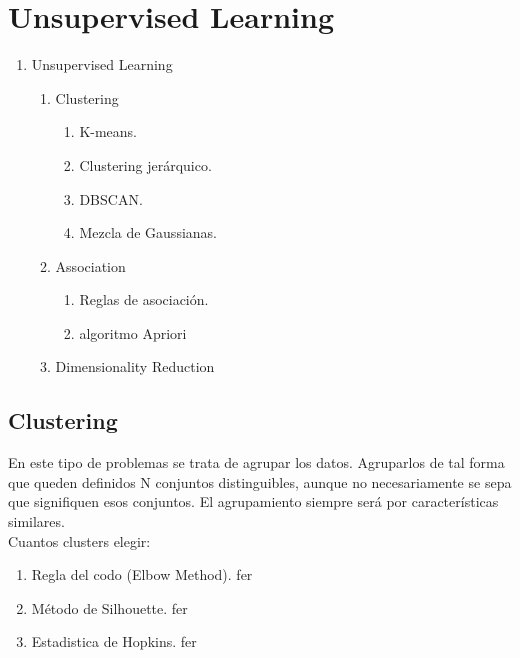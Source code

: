 \documentclass[../main.tex]{subfiles}
\begin{document}
\section{Unsupervised Learning}
    \begin{enumerate}
        \item Unsupervised Learning
        \begin{enumerate}
            \item Clustering
                \begin{enumerate}
                    \item K-means.
                    \item Clustering jerárquico.
                    \item DBSCAN.
                    \item Mezcla de Gaussianas.
                \end{enumerate}
            \item Association
                \begin{enumerate}
                    \item Reglas de asociación.
                    \item algoritmo Apriori
                \end{enumerate}
                        
            \item Dimensionality Reduction
        \end{enumerate}
    \end{enumerate}
    
    \subsection{Clustering}
        En este tipo de problemas se trata de agrupar los datos. Agruparlos de tal forma que queden definidos N conjuntos distinguibles, aunque no necesariamente se sepa que signifiquen esos conjuntos. El agrupamiento siempre será por características similares.\\
        
        Cuantos clusters elegir:
        \begin{enumerate}
            \item Regla del codo (Elbow Method). fer
            \item Método de Silhouette. fer 
            \item Estadistica de Hopkins. fer
        \end{enumerate}
        
\end{document}
